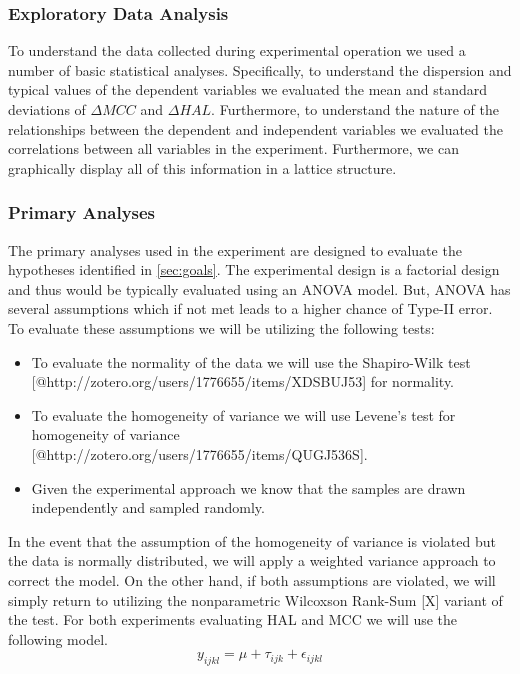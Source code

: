 \documentclass[10pt,nocc]{xrese_report}
\begin{document}
\subsubsection{Exploratory Data Analysis}

To understand the data collected during experimental operation we used a number of basic statistical analyses. Specifically, to understand the dispersion and typical values of the dependent variables we evaluated the mean and standard deviations of $\Delta MCC$ and $\Delta HAL$. Furthermore, to understand the nature of the relationships between the dependent and independent variables we evaluated the correlations between all variables in the experiment. Furthermore, we can graphically display all of this information in a lattice structure.

\subsubsection{Primary Analyses}

The primary analyses used in the experiment are designed to evaluate the hypotheses identified in \ref{sec:goals}. The experimental design is a factorial design and thus would be typically evaluated using an ANOVA model. But, ANOVA has several assumptions which if not met leads to a higher chance of Type-II error. To evaluate these assumptions we will be utilizing the following tests:

\begin{itemize}
\item To evaluate the normality of the data we will use the Shapiro-Wilk test [@http://zotero.org/users/1776655/items/XDSBUJ53] for normality.
\item To evaluate the homogeneity of variance we will use Levene's test for homogeneity of variance [@http://zotero.org/users/1776655/items/QUGJ536S].
\item Given the experimental approach we know that the samples are drawn independently and sampled randomly.
\end{itemize}

In the event that the assumption of the homogeneity of variance is violated but the data is normally distributed, we will apply a weighted variance approach to correct the model. On the other hand, if both assumptions are violated, we will simply return to utilizing the nonparametric Wilcoxson Rank-Sum [X] variant of the test. For both experiments evaluating HAL and MCC we will use the following model.
\[ y_{ijkl} = \mu + \tau_{ijk} + \epsilon_{ijkl} \]
\end{document}

